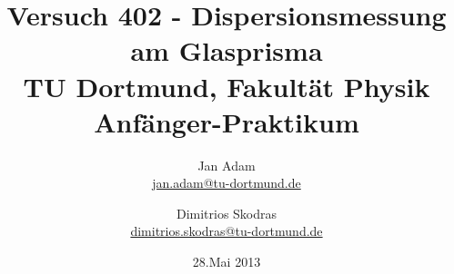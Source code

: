 



\title{Versuch 402 - Dispersionsmessung am Glasprisma\\				%
\large TU Dortmund, Fakultät Physik\\ 
\normalsize Anfänger-Praktikum}

\author{Jan Adam\\			%
{\small \href{jan.adam@tu-dortmund.de}{jan.adam@tu-dortmund.de}}	%
\and						%
Dimitrios Skodras\\					%
{\small \href{dimitrios.skodras@tu-dortmund.de}{dimitrios.skodras@tu-dortmund.de}}		%
}
\date{28.Mai 2013}				%





\maketitle					%
\thispagestyle{empty} 				%



\tableofcontents


\newpage					%


